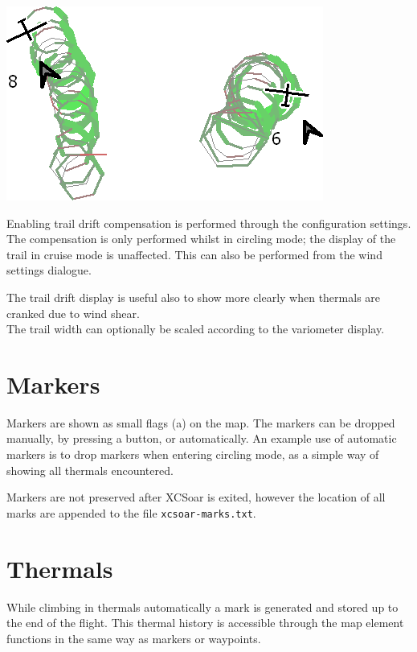 \begin{center}
\includegraphics[angle=0,width=0.6\linewidth,keepaspectratio='true']{figures/traildrift.png}
\end{center}

Enabling trail drift compensation is performed through the
configuration settings.  The compensation is only performed
whilst in circling mode; the display of the trail in cruise mode is unaffected.
This can also be performed from the wind settings dialogue.

The trail drift display is useful also to show more clearly when thermals
are cranked due to wind shear.\\
The trail width can optionally be scaled according to the variometer display.

\section{Markers}\label{sec:markers}

Markers are shown as small flags (a) on the map.  The markers can be dropped
manually, by pressing a button, or automatically.  An example use of
automatic markers is to drop markers when entering circling mode, as a
simple way of showing all thermals encountered.

Markers are not preserved after XCSoar is exited, however the location
of all marks are appended to the file \verb|xcsoar-marks.txt|.

\section{Thermals}

While climbing in thermals automatically a mark is generated and stored up 
to the end of the flight. This thermal history is accessible through the map 
element functions in the same way as markers or waypoints.


